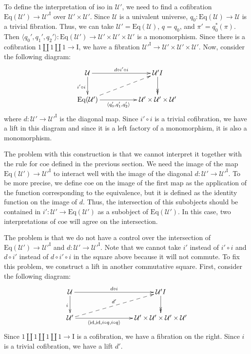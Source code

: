 \documentclass{amsart}
\theoremstyle{definition}
\theoremstyle{remark}
\newcommand{\fs}[1]{\mathrm{#1}}
\newcommand{\I}{\fs{I}}
\newcommand{\coe}{\fs{coe}}
\newcommand{\iso}{\fs{iso}}
\newcommand{\id}{\fs{id}}
\newcommand{\U}{\mathcal{U}}
\newcommand{\Eq}{\fs{Eq}}
\numberwithin{figure}{section}
\begin{document}
To define the interpretation of $\iso$ in $\U'$, we need to find a cofibration $\Eq(\U') \to \U'^\I$ over $\U' \times \U'$.
Since $\U$ is a univalent universe, $q_0 : \Eq(\U) \to \U$ is a trivial fibration.
Thus, we can take $\U' = \Eq(\U)$, $q = q_0$, and $\pi' = q_0^*(\pi)$.
Then $\langle q_0', q_1', q_2' \rangle : \Eq(\U') \to \U' \times \U' \times \U'$ is a monomorphism.
Since there is a cofibration $1 \amalg 1 \amalg 1 \to \I$, we have a fibration $\U'^\I \to \U' \times \U' \times \U'$.
Now, consider the following diagram:
\[ \xymatrix{ \U \ar[rr]^-{d \circ i' \circ i} \ar[d]_{i' \circ i}                  & & \U'^\I \ar@{->>}[d] \\
              \Eq(\U') \ar[rr]_-{\langle q_0', q_1', q_2' \rangle} \ar@{-->}[urr]   & & \U' \times \U' \times \U'
            } \]
where $d : \U' \to \U'^\I$ is the diagonal map.
Since $i' \circ i$ is a trivial cofibration, we have a lift in this diagram and since it is a left factory of a monomorphism, it is also a monomorphism.

The problem with this construction is that we cannot interpret it together with the rule for $\coe$ defined in the previous section.
We need the image of the map $\Eq(\U') \to \U'^\I$ to interact well with the image of the diagonal $d : \U' \to \U'^\I$.
To be more precise, we define $\coe$ on the image of the first map as the application of the function corresponding to the equivalence, but it is defined as the identity function on the image of $d$.
Thus, the intersection of this subobjects should be contained in $i' : \U' \to \Eq(\U')$ as a subobject of $\Eq(\U')$.
In this case, two interpretations of $\coe$ will agree on the intersection.

The problem is that we do not have a control over the intersection of $\Eq(\U') \to \U'^\I$ and $d : \U' \to \U'^\I$.
Note that we cannot take $i'$ instead of $i' \circ i$ and $d \circ i'$ instead of $d \circ i' \circ i$ in the square above because it will not commute.
To fix this problem, we construct a lift in another commutative square.
First, consider the following diagram:
\[ \xymatrix{ \U \ar[rrr]^-{d \circ i} \ar[d]_{i}                                                   & & & \U'^\I \ar@{->>}[d] \\
              \U' \ar[rrr]_-{\langle \id, \id, i \circ q, i \circ q \rangle} \ar@{-->}[urrr]^{d'}   & & & \U' \times \U' \times \U' \times \U'
            } \]
Since $1 \amalg 1 \amalg 1 \amalg 1 \to \I$ is a cofibration, we have a fibration on the right.
Since $i$ is a trivial cofibration, we have a lift $d'$.
\end{document}
